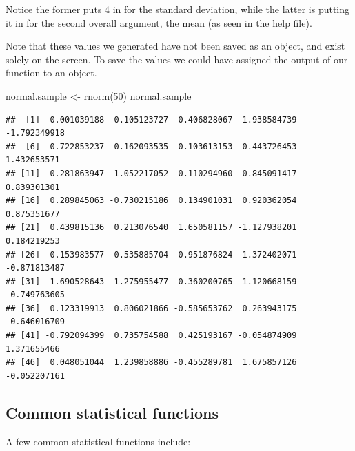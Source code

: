 \documentclass[
]{book}
\newenvironment{Shaded}{\begin{snugshade}}{\end{snugshade}}
\newcommand{\DecValTok}[1]{\textcolor[rgb]{0.00,0.00,0.81}{#1}}
\newcommand{\FunctionTok}[1]{\textcolor[rgb]{0.00,0.00,0.00}{#1}}
\newcommand{\NormalTok}[1]{#1}
\newcommand{\OtherTok}[1]{\textcolor[rgb]{0.56,0.35,0.01}{#1}}
\begin{document}
Notice the former puts 4 in for the standard deviation, while the latter is putting it in for the second overall argument, the mean (as seen in the help file).

Note that these values we generated have not been saved as an object, and exist solely on the screen. To save the values we could have assigned the output of our function to an object.

\begin{Shaded}
\begin{Highlighting}[]
\NormalTok{normal.sample }\OtherTok{\textless{}{-}} \FunctionTok{rnorm}\NormalTok{(}\DecValTok{50}\NormalTok{)}
\NormalTok{normal.sample}
\end{Highlighting}
\end{Shaded}

\begin{verbatim}
##  [1]  0.001039188 -0.105123727  0.406828067 -1.938584739 -1.792349918
##  [6] -0.722853237 -0.162093535 -0.103613153 -0.443726453  1.432653571
## [11]  0.281863947  1.052217052 -0.110294960  0.845091417  0.839301301
## [16]  0.289845063 -0.730215186  0.134901031  0.920362054  0.875351677
## [21]  0.439815136  0.213076540  1.650581157 -1.127938201  0.184219253
## [26]  0.153983577 -0.535885704  0.951876824 -1.372402071 -0.871813487
## [31]  1.690528643  1.275955477  0.360200765  1.120668159 -0.749763605
## [36]  0.123319913  0.806021866 -0.585653762  0.263943175 -0.646016709
## [41] -0.792094399  0.735754588  0.425193167 -0.054874909  1.371655466
## [46]  0.048051044  1.239858886 -0.455289781  1.675857126 -0.052207161
\end{verbatim}

\hypertarget{common-statistical-functions}{%
\subsection*{Common statistical functions}\label{common-statistical-functions}}

A few common statistical functions include:
\end{document}
